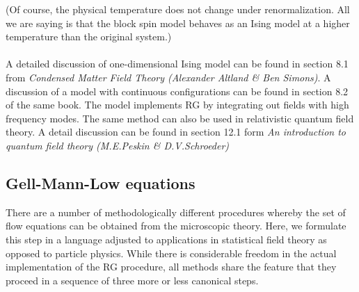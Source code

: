 (Of course, the physical temperature does not change under renormalization. All we are saying is that the block spin model behaves as an Ising model at a higher temperature than the original system.)
\\ \\
A detailed discussion of one-dimensional Ising model can be found in section 8.1 from \emph{Condensed Matter Field Theory (Alexander Altland \& Ben Simons)}. A discussion of a model with continuous configurations can be found in section 8.2 of the same book. The model implements RG by integrating out fields with high frequency modes. The same method can also be used in relativistic quantum  field theory. A detail discussion can be found in section 12.1 form \emph{An introduction to quantum field theory (M.E.Peskin \& D.V.Schroeder)}

\subsection{Gell-Mann-Low equations}
There are a number of methodologically different procedures whereby the set of flow equations can be obtained from the microscopic theory. Here, we formulate this step in a language adjusted to applications in statistical field theory as opposed to particle physics. While there is considerable freedom in the actual implementation of the RG procedure, all methods share the feature that they proceed in a sequence of three more or less canonical steps.
